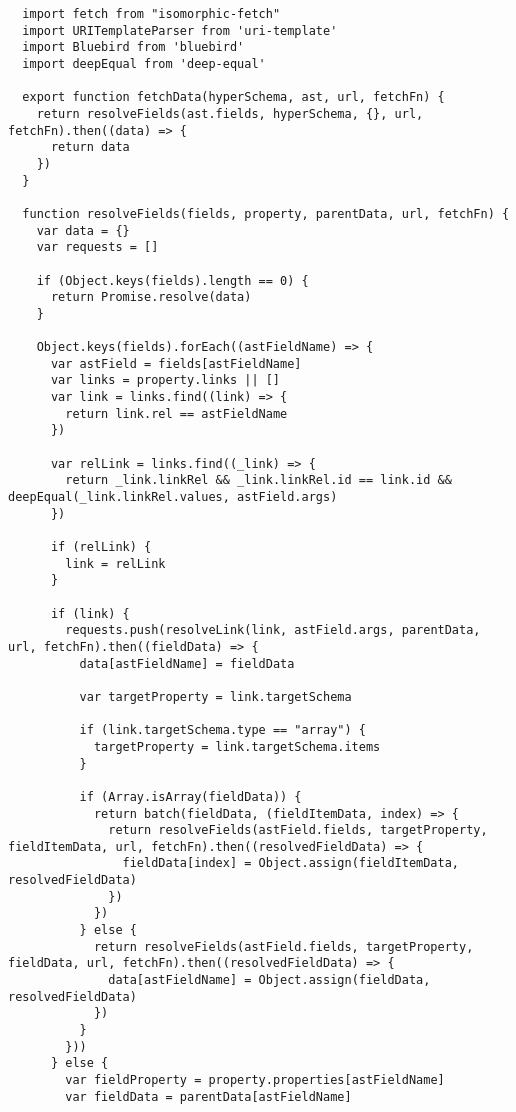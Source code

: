 \begin{verbatim}
  import fetch from "isomorphic-fetch"
  import URITemplateParser from 'uri-template'
  import Bluebird from 'bluebird'
  import deepEqual from 'deep-equal'

  export function fetchData(hyperSchema, ast, url, fetchFn) {
    return resolveFields(ast.fields, hyperSchema, {}, url, fetchFn).then((data) => {
      return data
    })
  }

  function resolveFields(fields, property, parentData, url, fetchFn) {
    var data = {}
    var requests = []

    if (Object.keys(fields).length == 0) {
      return Promise.resolve(data)
    }

    Object.keys(fields).forEach((astFieldName) => {
      var astField = fields[astFieldName]
      var links = property.links || []
      var link = links.find((link) => {
        return link.rel == astFieldName
      })

      var relLink = links.find((_link) => {
        return _link.linkRel && _link.linkRel.id == link.id && deepEqual(_link.linkRel.values, astField.args)
      })

      if (relLink) {
        link = relLink
      }

      if (link) {
        requests.push(resolveLink(link, astField.args, parentData, url, fetchFn).then((fieldData) => {
          data[astFieldName] = fieldData

          var targetProperty = link.targetSchema

          if (link.targetSchema.type == "array") {
            targetProperty = link.targetSchema.items
          }

          if (Array.isArray(fieldData)) {
            return batch(fieldData, (fieldItemData, index) => {
              return resolveFields(astField.fields, targetProperty, fieldItemData, url, fetchFn).then((resolvedFieldData) => {
                fieldData[index] = Object.assign(fieldItemData, resolvedFieldData)
              })
            })
          } else {
            return resolveFields(astField.fields, targetProperty, fieldData, url, fetchFn).then((resolvedFieldData) => {
              data[astFieldName] = Object.assign(fieldData, resolvedFieldData)
            })
          }
        }))
      } else {
        var fieldProperty = property.properties[astFieldName]
        var fieldData = parentData[astFieldName]


\end{verbatim}
